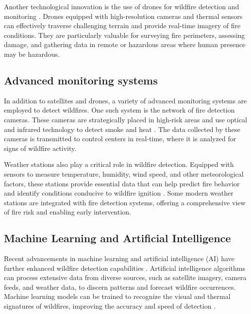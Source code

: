 \documentclass[
  12 pt,
]{Nemilov}
\begin{document}
Another technological innovation is the use of drones for wildfire detection and monitoring \citep{allison2016airborne, mohapatra2022early}. Drones equipped with high-resolution cameras and thermal sensors can effectively traverse challenging terrain and provide real-time imagery of fire conditions. They are particularly valuable for surveying fire perimeters, assessing damage, and gathering data in remote or hazardous areas where human presence may be hazardous.

\subsection{Advanced monitoring systems}\label{advanced-monitoring-systems}

In addition to satellites and drones, a variety of advanced monitoring systems are employed to detect wildfires. One such system is the network of fire detection cameras. These cameras are strategically placed in high-risk areas and use optical and infrared technology to detect smoke and heat \citep{heyns2019optimisation}. The data collected by these cameras is transmitted to control centers in real-time, where it is analyzed for signs of wildfire activity.

Weather stations also play a critical role in wildfire detection. Equipped with sensors to measure temperature, humidity, wind speed, and other meteorological factors, these stations provide essential data that can help predict fire behavior and identify conditions conducive to wildfire ignition \citep{naganathan2016wildfire}. Some modern weather stations are integrated with fire detection systems, offering a comprehensive view of fire risk and enabling early intervention.

\subsection{Machine Learning and Artificial Intelligence}\label{machine-learning-and-artificial-intelligence}

Recent advancements in machine learning and artificial intelligence (AI) have further enhanced wildfire detection capabilities \citep{joshi2024ml}. Artificial intelligence algorithms can process extensive data from diverse sources, such as satellite imagery, camera feeds, and weather data, to discern patterns and forecast wildfire occurrences. Machine learning models can be trained to recognize the visual and thermal signatures of wildfires, improving the accuracy and speed of detection \citep{jain2020review}.
\end{document}

